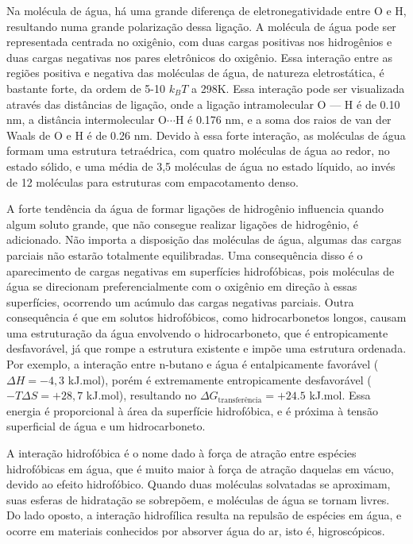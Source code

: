 	Na molécula de água, há uma grande diferença de eletronegatividade entre O e H, resultando numa grande polarização dessa ligação. A molécula de água pode ser representada centrada no oxigênio, com duas cargas positivas nos hidrogênios e duas cargas negativas nos pares eletrônicos do oxigênio. Essa interação entre as regiões positiva e negativa das moléculas de água, de natureza eletrostática, é bastante forte, da ordem de 5-10 \(k_BT\) a 298K. Essa interação pode ser visualizada através das distâncias de ligação, onde a ligação intramolecular O --- H é de 0.10 nm, a distância intermolecular \(\mathrm{O} \cdots \mathrm{H}\) é 0.176 nm, e a soma dos raios de van der Waals de O e H é de 0.26 nm. Devido à essa forte interação, as moléculas de água formam uma estrutura tetraédrica, com quatro moléculas de água ao redor, no estado sólido, e uma média de 3,5 moléculas de água no estado líquido, ao invés de 12 moléculas para estruturas com empacotamento denso.
	
	A forte tendência da água de formar ligações de hidrogênio influencia quando algum soluto grande, que não consegue realizar ligações de hidrogênio, é adicionado. Não importa a disposição das moléculas de água, algumas das cargas parciais não estarão totalmente equilibradas. Uma consequência disso é o aparecimento de cargas negativas em superfícies hidrofóbicas, pois moléculas de água se direcionam preferencialmente com o oxigênio em direção à essas superfícies, ocorrendo um acúmulo das cargas negativas parciais. Outra consequência é que em solutos hidrofóbicos, como hidrocarbonetos longos, causam uma estruturação da água envolvendo o hidrocarboneto, que é entropicamente desfavorável, já que rompe a estrutura existente e impõe uma estrutura ordenada. Por exemplo, a interação entre n-butano e água é entalpicamente favorável (\(\Delta H = -4,3\) kJ.mol\menosUm), porém é extremamente entropicamente desfavorável (\(-T\Delta S = +28,7\) kJ.mol\menosUm), resultando no \(\Delta G_{\mathrm{transferência}} = +24.5\) kJ.mol\menosUm. Essa energia é proporcional à área da superfície hidrofóbica, e é próxima à tensão superficial de água e um hidrocarboneto. 
	
	A interação hidrofóbica é o nome dado à força de atração entre espécies hidrofóbicas em água, que é muito maior à força de atração daquelas em vácuo, devido ao efeito hidrofóbico. Quando duas moléculas solvatadas se aproximam, suas esferas de hidratação se sobrepõem, e moléculas de água se tornam livres. Do lado oposto, a interação hidrofílica resulta na repulsão de espécies em água, e ocorre em materiais conhecidos por absorver água do ar, isto é, higroscópicos.
	
